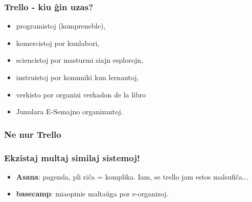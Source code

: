   \begin{frame}
    \frametitle{Trello - kiu ĝin uzas?}
    
    \begin{itemize}
    	\item programistoj (kompreneble),
    	\item komercistoj por kunlabori,
    	\item sciencistoj por masturmi siajn esplorojn,
    	\item instruistoj por komuniki kun lernantoj,
    	\item verkisto por organizi verkadon de la libro
    	\item Junulara E-Semajno organizantoj.
    \end{itemize}
    
  \end{frame}
  
  

  \begin{frame}
    \frametitle{Ne nur Trello}
    \frametitle{Ekzistaj multaj similaj sistemoj!}
    
    	\begin{itemize}
    		\item \textbf{Asana}: pagenda, pli riĉa = komplika. Iam, se trello jam estos malsufiĉa...
    		\item \textbf{basecamp}: miaopinie maltaŭga por e-organizoj. 
    	\end{itemize}
  \end{frame}

